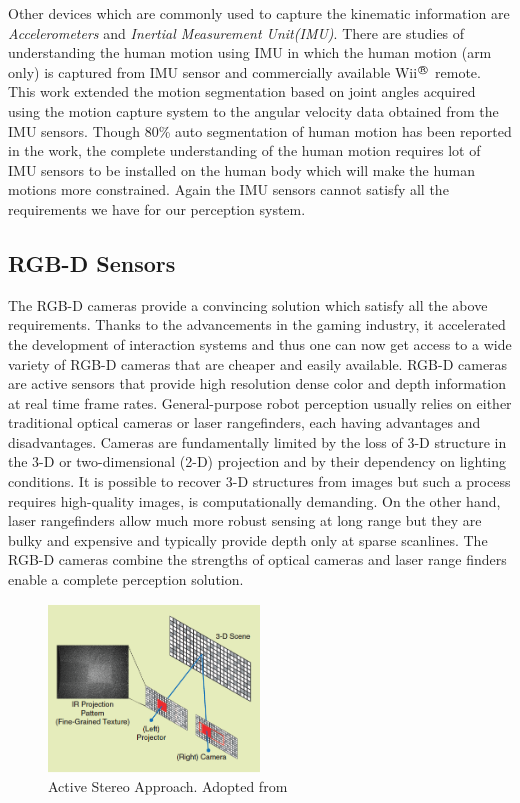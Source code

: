 	Other devices which are commonly used to capture the kinematic information are \emph{Accelerometers} and \emph{Inertial Measurement Unit(IMU)}. There are studies of understanding the human motion using IMU\cite{Aoki2013} in which the human motion (arm only) is captured from IMU sensor and commercially available Wii$^{\regmark}$ remote. This work extended the motion segmentation based on joint angles acquired using the motion capture system to the angular velocity data obtained from the IMU sensors. Though 80\% auto segmentation of human motion has been reported in the work, the complete understanding of the human motion requires lot of IMU sensors to be installed on the human body which will make the human motions more constrained. Again the IMU sensors cannot satisfy all the requirements we have for our perception system.
\subsection{RGB-D Sensors}
\label{ssec:rgbd_sensors}
	The RGB-D cameras provide a convincing solution which satisfy all the above requirements. Thanks to the advancements in the gaming industry, it accelerated the development of interaction systems and thus one can now get access to a wide variety of RGB-D cameras that are cheaper and easily available. RGB-D cameras\cite{Rgbd2013} are active sensors that provide high resolution dense color and depth information at real time frame rates. General-purpose robot perception usually relies on either traditional optical cameras or laser rangefinders, each having advantages and disadvantages. Cameras are fundamentally limited by the loss of 3-D structure in the 3-D or two-dimensional (2-D) projection and by their dependency on lighting conditions. It is possible to recover 3-D structures from images but such a process requires high-quality images, is computationally demanding. On the other hand, laser rangefinders allow much more robust sensing at long range but they are bulky and expensive and typically provide depth only at sparse scanlines. The RGB-D cameras combine the strengths of optical cameras and laser range finders enable a complete perception solution.
\begin{figure}
\centering
\includegraphics[width=0.5\textwidth]{assets/rgbd_activestereo.png}
\caption[Active Stereo Approach]{Active Stereo Approach. {Adopted from \cite{Rgbd2013}}}
\label{fig:rgbd_activestereo}
\end{figure}

